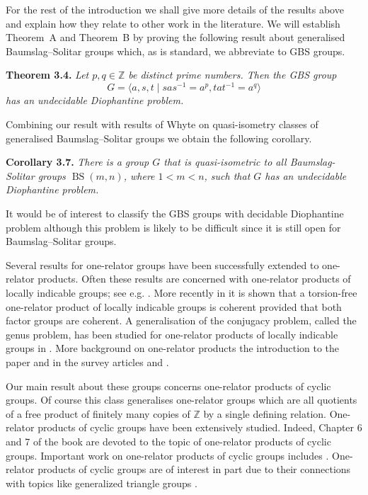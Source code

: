 \documentclass[11pt]{amsart}
\theoremstyle{definition}
\numberwithin{theorem}{section}
\DeclareMathOperator{\BS}{BS}
\newcommand{\Z}{\mathbb{Z}}
\begin{document}
For the rest of the introduction we shall give more details of the results above and explain how they relate to other work in the literature.   
We will establish Theorem~A and Theorem~B by proving the following result about generalised Baumslag--Solitar groups which, as is standard, we abbreviate to GBS groups.   

\textbf{Theorem 3.4.}
\emph{
Let \(p, q \in \mathbb{Z}\) be distinct prime numbers. Then the GBS group \[G = \langle a, s, t \mid sas^{-1} = a^p, tat^{-1} = a^q \rangle \]
has an undecidable Diophantine problem.} 

Combining our result with results of 
Whyte \cite{Whyte01} on quasi-isometry classes of generalised Baumslag--Solitar groups we obtain the following corollary.  

\textbf{Corollary 3.7.}
\emph{There is a group \(G\) that is quasi-isometric to all Baumslag-Solitar groups \(\BS(m, n)\), where \(1 < m < n\), such that \(G\) has an undecidable Diophantine problem.}

It would be of interest to classify the GBS groups with decidable Diophantine problem although this problem is likely to be difficult since it is still open for Baumslag--Solitar groups. 

Several results for one-relator groups have been successfully extended to
one-relator products. Often these results are concerned with one-relator
products of locally indicable groups; see e.g.  \cite{Howie84}. More recently in
\cite{JaikinZapirainLintonSanchezPeralta} it is shown that a torsion-free
one-relator product of locally indicable groups is coherent provided that both
factor groups are coherent. 
A generalisation of the conjugacy problem, called the genus problem, has been studied for one-relator products of locally indicable groups in \cite{Duncan1991}.
More background on one-relator products the introduction to the paper
\cite{DuncanArye} and in the survey articles \cite{DuncanHowie92} and \cite{FineRosenberger}. 

Our main result about these groups concerns one-relator products of cyclic groups. Of course this class generalises one-relator groups which are all quotients of a free product of finitely many copies of $\Z$ by a single defining relation.
One-relator products of cyclic groups have been extensively studied. 
Indeed,  
Chapter 6 and 7 of the book 
\cite{FineRosenberger}
are devoted to the topic of one-relator products of cyclic groups. 
Important work on one-relator products of cyclic groups includes 
\cite{
Brodskii84,
CampbellHeggieRobertsonThomas,
DuncanHowie93,
FineHowieRosenberger88,
Howie81,
HowieFourthPowers}.
One-relator products of cyclic groups are of interest in part due to their connections with topics like generalized triangle groups \cite{BaumslagMorganShalen}.
\end{document}
